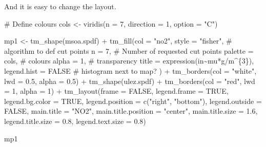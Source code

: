 \documentclass[
  letterpaper,
]{scrbook}
\newenvironment{Shaded}{\begin{snugshade}}{\end{snugshade}}
\newcommand{\AttributeTok}[1]{\textcolor[rgb]{0.40,0.45,0.13}{#1}}
\newcommand{\CommentTok}[1]{\textcolor[rgb]{0.37,0.37,0.37}{#1}}
\newcommand{\ConstantTok}[1]{\textcolor[rgb]{0.56,0.35,0.01}{#1}}
\newcommand{\DecValTok}[1]{\textcolor[rgb]{0.68,0.00,0.00}{#1}}
\newcommand{\FloatTok}[1]{\textcolor[rgb]{0.68,0.00,0.00}{#1}}
\newcommand{\FunctionTok}[1]{\textcolor[rgb]{0.28,0.35,0.67}{#1}}
\newcommand{\NormalTok}[1]{\textcolor[rgb]{0.00,0.23,0.31}{#1}}
\newcommand{\OtherTok}[1]{\textcolor[rgb]{0.00,0.23,0.31}{#1}}
\newcommand{\SpecialCharTok}[1]{\textcolor[rgb]{0.37,0.37,0.37}{#1}}
\newcommand{\StringTok}[1]{\textcolor[rgb]{0.13,0.47,0.30}{#1}}
\begin{document}
And it is easy to change the layout.

\begin{Shaded}
\begin{Highlighting}[]
\CommentTok{\# Define colours}
\NormalTok{cols }\OtherTok{\textless{}{-}} \FunctionTok{viridis}\NormalTok{(}\AttributeTok{n =} \DecValTok{7}\NormalTok{, }\AttributeTok{direction =} \DecValTok{1}\NormalTok{, }\AttributeTok{option =} \StringTok{"C"}\NormalTok{)}

\NormalTok{mp1 }\OtherTok{\textless{}{-}}  \FunctionTok{tm\_shape}\NormalTok{(msoa.spdf) }\SpecialCharTok{+} 
  \FunctionTok{tm\_fill}\NormalTok{(}\AttributeTok{col =} \StringTok{"no2"}\NormalTok{, }
          \AttributeTok{style =} \StringTok{"fisher"}\NormalTok{, }\CommentTok{\# algorithm to def cut points}
          \AttributeTok{n =} \DecValTok{7}\NormalTok{, }\CommentTok{\# Number of requested cut points}
          \AttributeTok{palette =}\NormalTok{ cols, }\CommentTok{\# colours}
          \AttributeTok{alpha =} \DecValTok{1}\NormalTok{, }\CommentTok{\# transparency }
          \AttributeTok{title =} \FunctionTok{expression}\NormalTok{(}\StringTok{\textquotesingle{}in\textquotesingle{}}\SpecialCharTok{\textasciitilde{}}\NormalTok{mu}\SpecialCharTok{*}\StringTok{\textquotesingle{}g\textquotesingle{}}\SpecialCharTok{/}\NormalTok{m}\SpecialCharTok{\^{}}\NormalTok{\{}\DecValTok{3}\NormalTok{\}), }
          \AttributeTok{legend.hist =} \ConstantTok{FALSE} \CommentTok{\# histogram next to map?}
\NormalTok{          ) }\SpecialCharTok{+}
  \FunctionTok{tm\_borders}\NormalTok{(}\AttributeTok{col =} \StringTok{"white"}\NormalTok{, }\AttributeTok{lwd =} \FloatTok{0.5}\NormalTok{, }\AttributeTok{alpha =} \FloatTok{0.5}\NormalTok{) }\SpecialCharTok{+}
  \FunctionTok{tm\_shape}\NormalTok{(ulez.spdf) }\SpecialCharTok{+}
  \FunctionTok{tm\_borders}\NormalTok{(}\AttributeTok{col =} \StringTok{"red"}\NormalTok{, }\AttributeTok{lwd =} \DecValTok{1}\NormalTok{, }\AttributeTok{alpha =} \DecValTok{1}\NormalTok{) }\SpecialCharTok{+}
  \FunctionTok{tm\_layout}\NormalTok{(}\AttributeTok{frame =} \ConstantTok{FALSE}\NormalTok{,}
            \AttributeTok{legend.frame =} \ConstantTok{TRUE}\NormalTok{, }\AttributeTok{legend.bg.color =} \ConstantTok{TRUE}\NormalTok{,}
            \AttributeTok{legend.position =} \FunctionTok{c}\NormalTok{(}\StringTok{"right"}\NormalTok{, }\StringTok{"bottom"}\NormalTok{),}
            \AttributeTok{legend.outside =} \ConstantTok{FALSE}\NormalTok{,}
            \AttributeTok{main.title =} \StringTok{"NO2"}\NormalTok{, }
            \AttributeTok{main.title.position =} \StringTok{"center"}\NormalTok{,}
            \AttributeTok{main.title.size =} \FloatTok{1.6}\NormalTok{,}
            \AttributeTok{legend.title.size =} \FloatTok{0.8}\NormalTok{,}
            \AttributeTok{legend.text.size =} \FloatTok{0.8}\NormalTok{)}

\NormalTok{mp1}
\end{Highlighting}
\end{Shaded}
\end{document}
